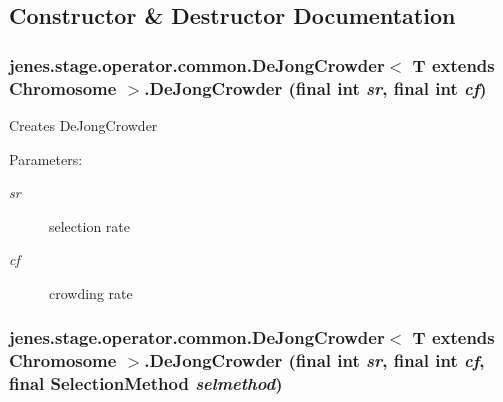 \subsection{Constructor \& Destructor Documentation}
\hypertarget{classjenes_1_1stage_1_1operator_1_1common_1_1_de_jong_crowder_3_01_t_01extends_01_chromosome_01_4_3a856be20539434c822eecf5fc099657}{
\subsubsection[DeJongCrowder]{\setlength{\rightskip}{0pt plus 5cm}jenes.stage.operator.common.DeJongCrowder$<$ T extends Chromosome $>$.DeJongCrowder (final int {\em sr}, \/  final int {\em cf})}}
\label{classjenes_1_1stage_1_1operator_1_1common_1_1_de_jong_crowder_3_01_t_01extends_01_chromosome_01_4_3a856be20539434c822eecf5fc099657}


Creates DeJongCrowder

\begin{Desc}
\item[Parameters:]
\begin{description}
\item[{\em sr}]selection rate \item[{\em cf}]crowding rate \end{description}
\end{Desc}
\hypertarget{classjenes_1_1stage_1_1operator_1_1common_1_1_de_jong_crowder_3_01_t_01extends_01_chromosome_01_4_552f2f1d77a10c3ae9fb8c94924fb798}{
\subsubsection[DeJongCrowder]{\setlength{\rightskip}{0pt plus 5cm}jenes.stage.operator.common.DeJongCrowder$<$ T extends Chromosome $>$.DeJongCrowder (final int {\em sr}, \/  final int {\em cf}, \/  final {\bf SelectionMethod} {\em selmethod})}}
\label{classjenes_1_1stage_1_1operator_1_1common_1_1_de_jong_crowder_3_01_t_01extends_01_chromosome_01_4_552f2f1d77a10c3ae9fb8c94924fb798}


